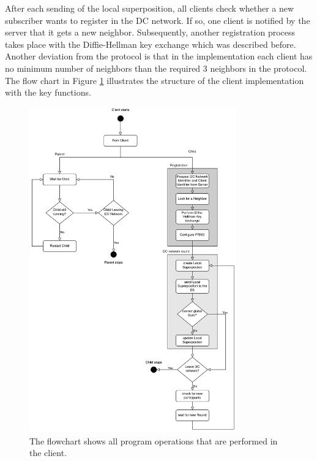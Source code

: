 After each sending of the local superposition, all clients check whether a new subscriber wants to register in the DC network. If so, one client is notified by the server that it gets a new neighbor. Subsequently, another registration process takes place with the Diffie-Hellman key exchange which was described before. Another deviation from the protocol is that in the implementation each client has no minimum number of neighbors than the required 3 neighbors in the protocol. The flow chart in Figure \ref{fig:Client Implementation} illustrates the structure of the client implementation with the key functions.
\begin{figure}[tbp]
  \centering
  \includegraphics[width=0.8\textwidth]{images/Client_structure2.png}
  \caption[Flowchart Client Implementatioen]{The flowchart shows all program operations that are performed in the client.}
  \label{fig:Client Implementation}
\end{figure}

